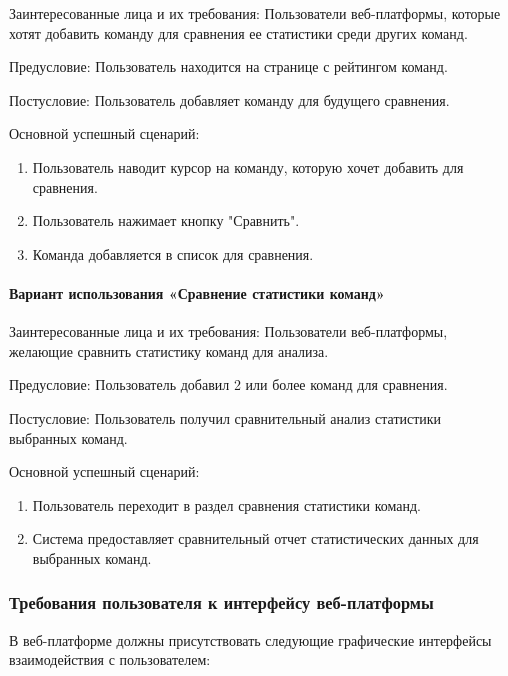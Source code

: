 Заинтересованные лица и их требования: Пользователи веб-платформы, которые хотят добавить команду для сравнения ее статистики среди других команд.

Предусловие: Пользователь находится на странице с рейтингом команд.

Постусловие: Пользователь добавляет команду для будущего сравнения.

Основной успешный сценарий:
\begin{enumerate}
	\item Пользователь наводит курсор на команду, которую хочет добавить для сравнения.
	\item Пользователь нажимает кнопку "Сравнить".
	\item Команда добавляется в список для сравнения.
\end{enumerate}

\paragraph{Вариант использования «Сравнение статистики команд»}

Заинтересованные лица и их требования: Пользователи веб-платформы, желающие сравнить статистику команд для анализа.

Предусловие: Пользователь добавил 2 или более команд для сравнения.

Постусловие: Пользователь получил сравнительный анализ статистики выбранных команд.

Основной успешный сценарий:
\begin{enumerate}
	\item Пользователь переходит в раздел сравнения статистики команд.
	\item Система предоставляет сравнительный отчет статистических данных для выбранных команд.
\end{enumerate}

\subsubsection{Требования пользователя к интерфейсу веб-платформы}

В веб-платформе должны присутствовать следующие графические интерфейсы взаимодействия с пользователем:

